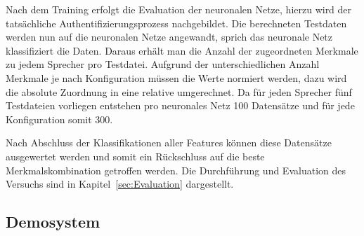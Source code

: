 Nach dem Training erfolgt die Evaluation der neuronalen Netze, hierzu wird der tatsächliche Authentifizierungsprozess nachgebildet.
Die berechneten Testdaten werden nun auf die neuronalen Netze angewandt, sprich das neuronale Netz klassifiziert die Daten.
Daraus erhält man die Anzahl der zugeordneten Merkmale zu jedem Sprecher pro Testdatei.
Aufgrund der unterschiedlichen Anzahl Merkmale je nach Konfiguration müssen die Werte normiert werden, dazu wird die absolute Zuordnung in eine relative umgerechnet.
Da für jeden Sprecher fünf Testdateien vorliegen entstehen pro neuronales Netz 100 Datensätze und für jede Konfiguration somit 300.

Nach Abschluss der Klassifikationen aller Features können diese Datensätze ausgewertet werden und somit ein Rückschluss auf die beste Merkmalskombination getroffen werden.
Die Durchführung und Evaluation des Versuchs sind in Kapitel~\ref{sec:Evaluation} dargestellt.


\subsection{Demosystem}